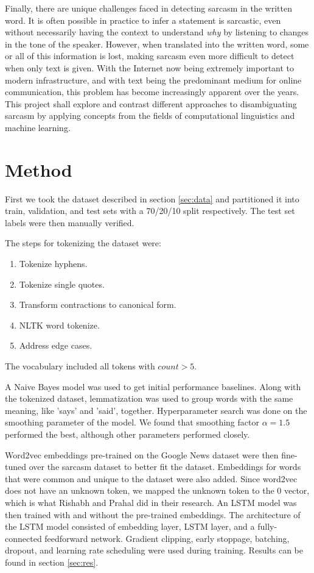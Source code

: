 \documentclass[11pt]{article}
\begin{document}
Finally, there are unique challenges faced in detecting sarcasm in the written
word. It is often possible in practice to infer a statement is sarcastic, even
without necessarily having the context to understand \textit{why} by listening
to changes in the tone of the speaker. However, when translated into the
written word, some or all of this information is lost, making sarcasm even more
difficult to detect when only text is given. With the Internet now being
extremely important to modern infrastructure, and with text being the
predominant medium for online communication, this problem has become
increasingly apparent over the years. This project shall explore and contrast
different approaches to disambiguating sarcasm by applying concepts from the
fields of computational linguistics and machine learning.

\section{Method}

First we took the dataset described in section \ref{sec:data}
and partitioned it into train, validation, and test sets with a 70/20/10 split respectively.
The test set labels were then manually verified.

The steps for tokenizing the dataset were:
\begin{enumerate}
    \item Tokenize hyphens.
    \item Tokenize single quotes.
    \item Transform contractions to canonical form.
    \item NLTK word tokenize.
    \item Address edge cases.
\end{enumerate}
The vocabulary included all tokens with $ count > 5 $.

A Naive Bayes model was used to get initial performance baselines.
Along with the tokenized dataset,
lemmatization was used to group words with the same meaning,
like 'says' and 'said', together.
Hyperparameter search was done on the smoothing parameter of the model.
We found that smoothing factor $ \alpha = 1.5 $ performed the best, 
although other parameters performed closely.

Word2vec embeddings pre-trained on the Google News dataset
were then fine-tuned over the sarcasm dataset to better fit the dataset. \cite{google-word2vec}
Embeddings for words that were common and unique to the dataset were also added.
Since word2vec does not have an unknown token,
we mapped the unknown token to the 0 vector,
which is what Rishabh and Prahal did in their research. \cite{misra2023Sarcasm}
An LSTM model was then trained with and without the pre-trained embeddings.
The architecture of the LSTM model consisted of
embedding layer, LSTM layer, and a fully-connected feedforward network.
Gradient clipping, early stoppage, batching, dropout,
and learning rate scheduling were used during training. 
Results can be found in section \ref{sec:res}.
\end{document}

